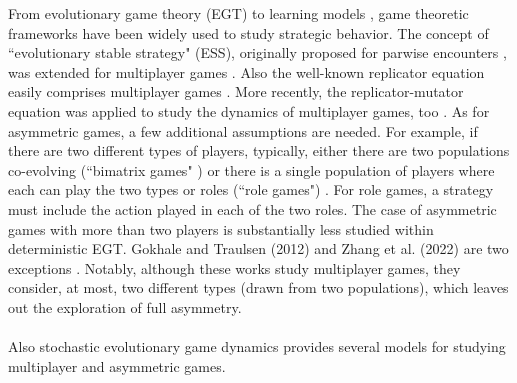 \documentclass[11pt]{article}
\theoremstyle{plainCl1}
\theoremstyle{plainCl2}
\begin{document}
\noindent From evolutionary game theory (EGT) \cite{Maynard-Smith:Nature:1973, Maynard-Smith:book:1982, Hofbauer:book:1998, Nowak:book:2006} to learning models \cite{Sandholm:BioSys:1996, Fudenberg:book:1998b, Macy:PNAS:2002, Pangallo:GEB:2022}, game theoretic frameworks have been widely used to study strategic behavior. %
\noindent The concept of ``evolutionary stable strategy" (ESS), originally proposed for parwise encounters \cite{Maynard-Smith:Nature:1973}, was extended for multiplayer games \cite{Palm:JMB:1984, Broom:BMB:1997, Bukowski:IJGT:2004}. Also the well-known replicator equation \cite{Taylor:MB:1978, Hofbauer:book:1998} easily comprises multiplayer games \cite{Hauert:JTB:2006a, gokhale:PNAS:2010, Pena:Evolution:2011, Cressman:PNAS:2014, Pena:JTB:2014}. More recently, the replicator-mutator equation was applied to study the dynamics of multiplayer games, too \cite{Duong:DGAA:2020}. 
As for asymmetric games, a few additional assumptions are needed. For example, if there are two different types of players, typically, either there are two populations co-evolving (``bimatrix games" \cite{Hofbauer:book:1998, Gokhale:PRSB:2012, Tuyls:SciRep:2018}) or there is a single population of players where each can play the two types or roles (``role games") \cite{Hofbauer:book:1998}. For role games, a strategy must include the action played in each of the two roles. The case of asymmetric games with more than two players is substantially less studied within deterministic EGT. Gokhale and Traulsen (2012) and Zhang et al. (2022) are two exceptions \cite{Gokhale:PRSB:2012, Zhang:arxiv:2022}. Notably, although these works study multiplayer games, they consider, at most, two different types (drawn from two populations), which leaves out the exploration of full asymmetry.
\\ \\
\noindent Also stochastic evolutionary game dynamics \cite{Nowak:Nature:2004, Traulsen:bookchapter:2009} provides several models for studying multiplayer and asymmetric games. 
\end{document}
